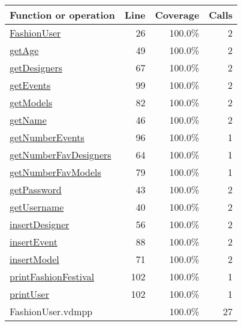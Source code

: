 \begin{longtable}{|l|r|r|r|}
\hline
Function or operation & Line & Coverage & Calls \\
\hline
\hline
\hyperref[FashionUser:26]{FashionUser} & 26&100.0\% & 2 \\
\hline
\hyperref[getAge:49]{getAge} & 49&100.0\% & 2 \\
\hline
\hyperref[getDesigners:67]{getDesigners} & 67&100.0\% & 2 \\
\hline
\hyperref[getEvents:99]{getEvents} & 99&100.0\% & 2 \\
\hline
\hyperref[getModels:82]{getModels} & 82&100.0\% & 2 \\
\hline
\hyperref[getName:46]{getName} & 46&100.0\% & 2 \\
\hline
\hyperref[getNumberEvents:96]{getNumberEvents} & 96&100.0\% & 1 \\
\hline
\hyperref[getNumberFavDesigners:64]{getNumberFavDesigners} & 64&100.0\% & 1 \\
\hline
\hyperref[getNumberFavModels:79]{getNumberFavModels} & 79&100.0\% & 1 \\
\hline
\hyperref[getPassword:43]{getPassword} & 43&100.0\% & 2 \\
\hline
\hyperref[getUsername:40]{getUsername} & 40&100.0\% & 2 \\
\hline
\hyperref[insertDesigner:56]{insertDesigner} & 56&100.0\% & 2 \\
\hline
\hyperref[insertEvent:88]{insertEvent} & 88&100.0\% & 2 \\
\hline
\hyperref[insertModel:71]{insertModel} & 71&100.0\% & 2 \\
\hline
\hyperref[printFashionFestival:102]{printFashionFestival} & 102&100.0\% & 1 \\
\hline
\hyperref[printUser:102]{printUser} & 102&100.0\% & 1 \\
\hline
\hline
FashionUser.vdmpp & & 100.0\% & 27 \\
\hline
\end{longtable}

